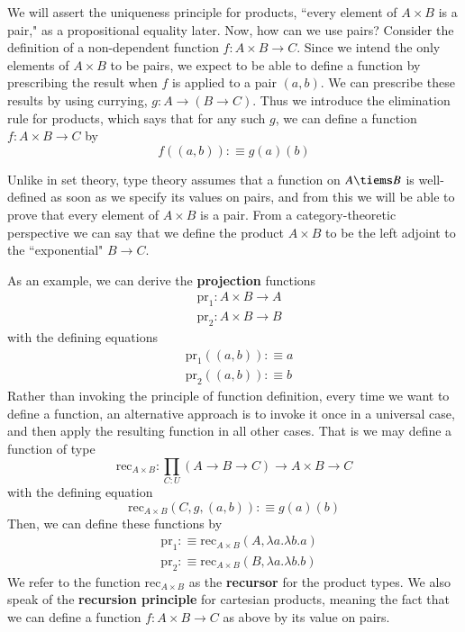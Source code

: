 We will assert the uniqueness principle for products, ``every element of $A\times B$ is a pair," as a propositional equality later. Now, how can we use pairs? Consider the definition of a non-dependent function $f:A\times B\rightarrow C$. Since we intend the only elements of $A \times B$ to be pairs, we expect to be able to define a function by prescribing the result when $f$ is applied to a pair $(a,b)$. We can prescribe these results by using currying, $g:A\rightarrow (B\rightarrow C)$. Thus we introduce the elimination rule for products, which says that for any such $g$, we can define a function $f:A\times B\rightarrow C$ by $$f((a,b)) :\equiv g(a)(b)$$

Unlike in set theory, type theory assumes that a function on $A\tiems B$ is well-defined as soon as we specify its values on pairs, and from this we will be able to prove that every element of $A\times B$ is a pair. From a category-theoretic perspective we can say that we define the product $A\times B$ to be the left adjoint to the ``exponential" $B\rightarrow C$.

As an example, we can derive the \textbf{projection} functions \begin{align*}
    &\text{pr}_1:A\times B\rightarrow A \\
    &\text{pr}_2:A\times B\rightarrow B
\end{align*}
with the defining equations \begin{align*}
    &\text{pr}_1((a,b)) :\equiv a \\
    &\text{pr}_2((a,b)) :\equiv b 
\end{align*}
Rather than invoking the principle of function definition, every time we want to define a function, an alternative approach is to invoke it once in a universal case, and then apply the resulting function in all other cases. That is we may define a function of type \begin{equation}
    \text{rec}_{A\times B}:\prod_{C:U}(A\rightarrow B\rightarrow C)\rightarrow A\times B\rightarrow C
\end{equation}
with the defining equation $$\text{rec}_{A\times B}(C,g,(a,b)) :\equiv g(a)(b)$$
Then, we can define these functions by \begin{align*}
    &\text{pr}_1 :\equiv \text{rec}_{A\times B}(A,\lambda a.\lambda b.a) \\
    &\text{pr}_2 :\equiv \text{rec}_{A\times B}(B,\lambda a.\lambda b.b)
\end{align*}
We refer to the function $\text{rec}_{A\times B}$ as the \textbf{recursor} for the product types. We also speak of the \textbf{recursion principle} for cartesian products, meaning the fact that we can define a function $f:A\times B\rightarrow C$ as above by its value on pairs.

